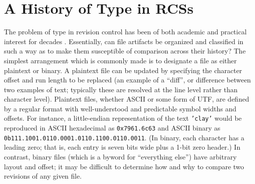 \documentclass[twoside]{article}
\begin{document}
\section{A History of Type in RCSs}

The problem of type in revision control has been of both academic and practical interest for decades \citep{Perry1987}.  Essentially, can file artifacts be organized and classified in such a way as to make them susceptible of comparison across their history?  The simplest arrangement which is commonly made is to designate a file as either plaintext or binary.  A plaintext file can be updated by specifying the character offset and run length to be replaced (an example of a “diff”, or difference between two examples of text; typically these are resolved at the line level rather than character level).  Plaintext files, whether ASCII or some form of UTF, are defined by a regular format with well-understood and predictable symbol widths and offsets.  For instance, a little-endian representation of the text \texttt{'clay'} would be reproduced in ASCII hexadecimal as \texttt{0x7961.6c63} and ASCII binary as \texttt{0b111.1001.0110.0001.0110.1100.0110.0011}.  (In binary, each character has a leading zero; that is, each entry is seven bits wide plus a 1-bit zero header.)  In contrast, binary files (which is a byword for “everything else”) have arbitrary layout and offset; it may be difficult to determine how and why to compare two revisions of any given file.
\end{document}
